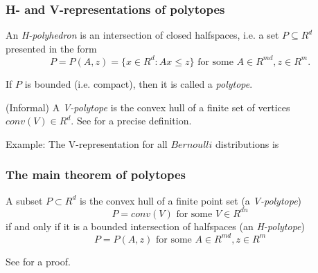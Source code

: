 \begin{frame}
\frametitle{H- and V-representations of polytopes}

\begin{definition}
An \emph{H-polyhedron} is an intersection of closed halfspaces, i.e. a set $P \subseteq R^d$ presented in the form
\begin{equation*}
P = P(A,z)=\{ x \in R^d: Ax \leq z\} \textrm{ for some } A \in R^{m d}, z \in R^m.
\end{equation*}
\end{definition}

If $P$ is bounded (i.e. compact), then it is called a \emph{polytope}.

\begin{definition}
(Informal) A \emph{V-polytope} is the convex hull of a finite set of vertices $conv(V) \in R^d$. See \cite{ziegler2012lectures} for a precise definition.
\end{definition}

Example: The V-representation for all $Bernoulli$ distributions is
\end{frame}


\begin{frame}
\frametitle{The main theorem of polytopes}

\begin{theorem}
  A subset $P \subset R^d$ is the convex hull of a finite point set (a \emph{V-polytope}) 
  \begin{equation*}
    P = conv(V) \textrm{ for some }V \in R^{dn}
  \end{equation*}
if and only if it is a bounded intersection of halfspaces (an \emph{H-polytope}) 
\begin{equation*}
  P = P(A,z) \textrm{ for some }A \in R^{md}, z \in R^m
\end{equation*}
\end{theorem}

See \cite{ziegler2012lectures} for a proof.\newline
\end{frame}


